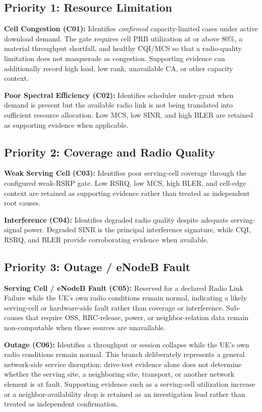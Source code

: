 \subsection{Priority 1: Resource Limitation}

\textbf{Cell Congestion (C01):} Identifies \emph{confirmed} capacity-limited cases under active download demand. The gate requires cell PRB utilization at or above 80\%, a material throughput shortfall, and healthy CQI/MCS so that a radio-quality limitation does not masquerade as congestion. Supporting evidence can additionally record high load, low rank, unavailable CA, or other capacity context.

\textbf{Poor Spectral Efficiency (C02):} Identifies scheduler under-grant when demand is present but the available radio link is not being translated into sufficient resource allocation. Low MCS, low SINR, and high BLER are retained as supporting evidence when applicable.

\subsection{Priority 2: Coverage and Radio Quality}

\textbf{Weak Serving Cell (C03):} Identifies poor serving-cell coverage through the configured weak-RSRP gate. Low RSRQ, low MCS, high BLER, and cell-edge context are retained as supporting evidence rather than treated as independent root causes.

\textbf{Interference (C04):} Identifies degraded radio quality despite adequate serving-signal power. Degraded SINR is the principal interference signature, while CQI, RSRQ, and BLER provide corroborating evidence when available.

\subsection{Priority 3: Outage / eNodeB Fault}

\textbf{Serving Cell / eNodeB Fault (C05):} Reserved for a declared Radio Link Failure while the UE's own radio conditions remain normal, indicating a likely serving-cell or hardware-side fault rather than coverage or interference. Sub-causes that require OSS, RRC-release, power, or neighbor-relation data remain non-computable when those sources are unavailable.

\textbf{Outage (C06):} Identifies a throughput or session collapse while the UE's own radio conditions remain normal. This branch deliberately represents a general network-side service disruption: drive-test evidence alone does not determine whether the serving site, a neighboring site, transport, or another network element is at fault. Supporting evidence such as a serving-cell utilization increase or a neighbor-availability drop is retained as an investigation lead rather than treated as independent confirmation.

